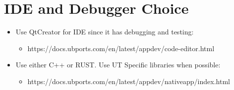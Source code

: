 \section{IDE and Debugger Choice}


\begin{itemize}
	\item Use QtCreator for IDE since it has debugging and testing:
	\begin{itemize}
		\item https://docs.ubports.com/en/latest/appdev/code-editor.html
	\end{itemize}
\end{itemize}


\begin{itemize}
	\item Use either C++ or RUST. Use UT Specific libraries when possible:
	\begin{itemize}
		\item https://docs.ubports.com/en/latest/appdev/nativeapp/index.html
	\end{itemize}
\end{itemize}
